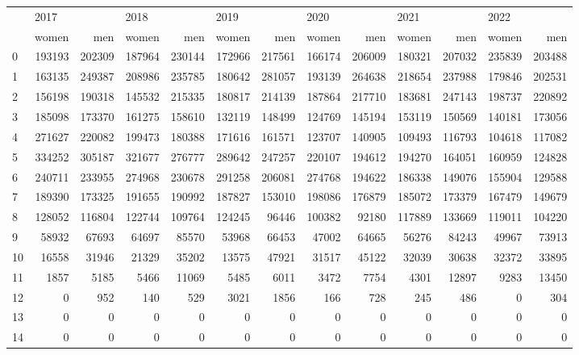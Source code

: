 \begin{tabular}{lrrrrrrrrrrrr}
\toprule
{} & \multicolumn{2}{l}{2017} & \multicolumn{2}{l}{2018} & \multicolumn{2}{l}{2019} & \multicolumn{2}{l}{2020} & \multicolumn{2}{l}{2021} & \multicolumn{2}{l}{2022} \\
{} &   women &     men &   women &     men &   women &     men &   women &     men &   women &     men &   women &     men \\
\midrule
0  &  193193 &  202309 &  187964 &  230144 &  172966 &  217561 &  166174 &  206009 &  180321 &  207032 &  235839 &  203488 \\
1  &  163135 &  249387 &  208986 &  235785 &  180642 &  281057 &  193139 &  264638 &  218654 &  237988 &  179846 &  202531 \\
2  &  156198 &  190318 &  145532 &  215335 &  180817 &  214139 &  187864 &  217710 &  183681 &  247143 &  198737 &  220892 \\
3  &  185098 &  173370 &  161275 &  158610 &  132119 &  148499 &  124769 &  145194 &  153119 &  150569 &  140181 &  173056 \\
4  &  271627 &  220082 &  199473 &  180388 &  171616 &  161571 &  123707 &  140905 &  109493 &  116793 &  104618 &  117082 \\
5  &  334252 &  305187 &  321677 &  276777 &  289642 &  247257 &  220107 &  194612 &  194270 &  164051 &  160959 &  124828 \\
6  &  240711 &  233955 &  274968 &  230678 &  291258 &  206081 &  274768 &  194622 &  186338 &  149076 &  155904 &  129588 \\
7  &  189390 &  173325 &  191655 &  190992 &  187827 &  153010 &  198086 &  176879 &  185072 &  173379 &  167479 &  149679 \\
8  &  128052 &  116804 &  122744 &  109764 &  124245 &   96446 &  100382 &   92180 &  117889 &  133669 &  119011 &  104220 \\
9  &   58932 &   67693 &   64697 &   85570 &   53968 &   66453 &   47002 &   64665 &   56276 &   84243 &   49967 &   73913 \\
10 &   16558 &   31946 &   21329 &   35202 &   13575 &   47921 &   31517 &   45122 &   32039 &   30638 &   32372 &   33895 \\
11 &    1857 &    5185 &    5466 &   11069 &    5485 &    6011 &    3472 &    7754 &    4301 &   12897 &    9283 &   13450 \\
12 &       0 &     952 &     140 &     529 &    3021 &    1856 &     166 &     728 &     245 &     486 &       0 &     304 \\
13 &       0 &       0 &       0 &       0 &       0 &       0 &       0 &       0 &       0 &       0 &       0 &       0 \\
14 &       0 &       0 &       0 &       0 &       0 &       0 &       0 &       0 &       0 &       0 &       0 &       0 \\
\bottomrule
\end{tabular}
